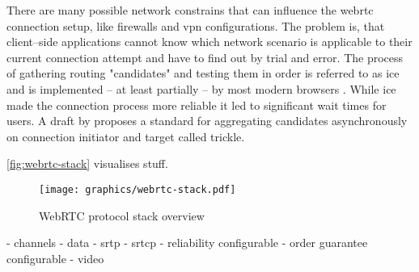 There are many possible network constrains that can influence the \gls{webrtc} connection setup, like firewalls and \gls{vpn} configurations. The problem is, that client–side applications cannot know which network scenario is applicable to their current connection attempt and have to find out by trial and error. The process of gathering routing "candidates" and testing them in order is referred to as \gls{ice} \cite{ice-rfc} and is implemented – at least partially – by most modern browsers \cite{webrtc-browser-compat}. While \gls{ice} made the connection process more reliable it led to significant wait times for users. A draft by \citet{trickle-ice} proposes a standard for aggregating candidates asynchronously on connection initiator and target called trickle.

\vref{fig:webrtc-stack} visualises stuff.

\begin{figure}
\centering
\texttt{[image: graphics/webrtc-stack.pdf]}
\caption{WebRTC protocol stack overview}
\label{fig:webrtc-stack}
\end{figure}

- channels
    - data
        - \gls{srtp}
        - \gls{srtcp}
        - reliability configurable
        - order guarantee configurable
    - video
